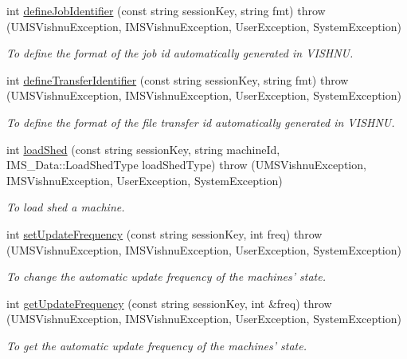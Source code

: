 \begin{DoxyCompactItemize}
int \hyperlink{namespacevishnu_a1b44c77d6bccf4fd886be4028f27bb73}{defineJobIdentifier} (const string sessionKey, string fmt)  throw (UMSVishnuException, IMSVishnuException, UserException, SystemException)
\begin{DoxyCompactList}\small\item\em To define the format of the job id automatically generated in VISHNU. \item\end{DoxyCompactList}\item 
int \hyperlink{namespacevishnu_adc1d08f000cf50058dd8b0688ea7fb1f}{defineTransferIdentifier} (const string sessionKey, string fmt)  throw (UMSVishnuException, IMSVishnuException, UserException, SystemException)
\begin{DoxyCompactList}\small\item\em To define the format of the file transfer id automatically generated in VISHNU. \item\end{DoxyCompactList}\item 
int \hyperlink{namespacevishnu_ab088d903ec32abcb3ad6f1d2336c04ac}{loadShed} (const string sessionKey, string machineId, IMS\_\-Data::LoadShedType loadShedType)  throw (UMSVishnuException, IMSVishnuException, UserException, SystemException)
\begin{DoxyCompactList}\small\item\em To load shed a machine. \item\end{DoxyCompactList}\item 
int \hyperlink{namespacevishnu_a860094ba973969b94110555d6bb3b557}{setUpdateFrequency} (const string sessionKey, int freq)  throw (UMSVishnuException, IMSVishnuException, UserException, SystemException)
\begin{DoxyCompactList}\small\item\em To change the automatic update frequency of the machines' state. \item\end{DoxyCompactList}\item 
int \hyperlink{namespacevishnu_a5b13b2b9e19299c652246a9533f92717}{getUpdateFrequency} (const string sessionKey, int \&freq)  throw (UMSVishnuException, IMSVishnuException, UserException, SystemException)
\begin{DoxyCompactList}\small\item\em To get the automatic update frequency of the machines' state. \item\end{DoxyCompactList}\item 

\end{DoxyCompactItemize}
